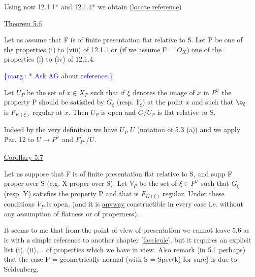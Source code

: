 \documentclass[11pt]{article}
\newcommand{\scanpage}[1]{\par\bigskip\noindent{\small\sffamily[scan #1]}\par}
\newcommand{\mspage}[1]{{\small\sffamily[p.\,#1]}}
\newcommand{\margin}[1]{\textcolor{blue}{\{\textsf{marg.:} #1\}}}
\newcommand{\uline}[1]{\underline{#1}}
\begin{document}
Using now 12.1.1* and 12.1.4* we obtain (\uline{locate reference})

\uline{Theorem 5.6}

Let us assume that F is of finite presentation flat relative
to S. Let P be one of the properties (i) to (viii) of 12.1.1 or
(if we assume F = $O_{X}$) one of the properties (i) to (iv) of 12.1.4.

\margin{* Ask AG about reference.}

\clearpage
\scanpage{24/29}
\mspage{29}

Let $U_{P}$ be the set of $x \in X_{P}$ such that if $\xi$ denotes the image of $x$
in $P^{\vee}$ the property P should be satisfied by $G_{\xi}$ (resp. $Y_{\xi}$) at the
point $x$ and such that $\o_{\xi}$ is $F_{K(\xi)}$ regular at $x$.  Then $U_{P}$ is open and
$G/U_{P}$ is flat relative to S.

Indeed by the very definition we have $U_{P}$ \quad $U$ (notation of 5.3
(a)) and we apply Par. 12 to $U \to P^{\vee}$ and $F_{\underline{P}^{\vee}}/U$.

\uline{Corollary 5.7}

Let us suppose that F is of finite presentation flat relative
to S, and supp F proper over S (e.g. X proper over S).  Let $V_{P}$ be
the set of $\xi \in P^{\vee}$ such that $G_{\xi}$ (resp. Y) satisfies the property P
and that is $F_{K(\xi)}$ regular.  Under these conditions $V_{P}$ is open, (and
it is \uline{anyway} constructible in every case i.e. without any
assumption of flatness or of properness).

It seems to me that from the point of view of presentation we
cannot leave 5.6 as is with a simple reference to another chapter
[\uline{fascicule}], but it requires an explicit list (i), (ii),... of
properties which we have in view.  Also remark (in 5.1 perhaps)
that the case P = geometrically normal (with S = Spec(k) for sure)
is due to Seidenberg.

\clearpage
\scanpage{24/30}
\mspage{30}
\end{document}
